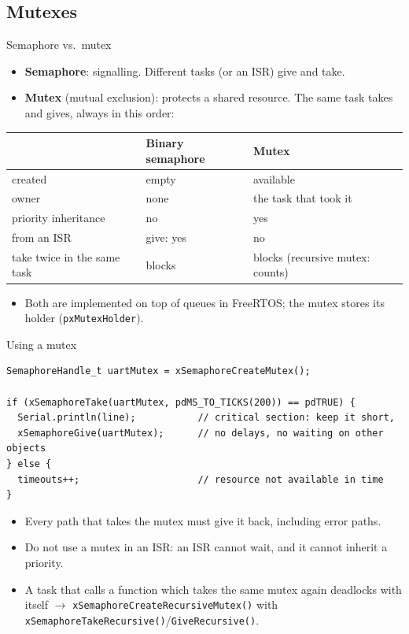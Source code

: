 \subsection{Mutexes}
\begin{frame}{Semaphore vs.\ mutex}
  \begin{itemize}
    \item \textbf{Semaphore}: signalling. Different tasks (or an ISR) give and take.
    \item \textbf{Mutex} (mutual exclusion): protects a shared resource. The same task takes and gives, always in this order:
  \end{itemize}
  \begin{center}\small
  \begin{tabular}{@{}lll@{}}
    \toprule
    & Binary semaphore & Mutex \\
    \midrule
    created & empty & available \\
    owner & none & the task that took it \\
    priority inheritance & no & yes \\
    from an ISR & give: yes & no \\
    take twice in the same task & blocks & blocks (recursive mutex: counts) \\
    \bottomrule
  \end{tabular}
  \end{center}
  \begin{itemize}
    \item Both are implemented on top of queues in FreeRTOS; the mutex stores its holder (\texttt{pxMutexHolder}).
  \end{itemize}
\end{frame}

\begin{frame}[fragile]{Using a mutex}
\begin{lstlisting}
SemaphoreHandle_t uartMutex = xSemaphoreCreateMutex();

if (xSemaphoreTake(uartMutex, pdMS_TO_TICKS(200)) == pdTRUE) {
  Serial.println(line);           // critical section: keep it short,
  xSemaphoreGive(uartMutex);      // no delays, no waiting on other objects
} else {
  timeouts++;                     // resource not available in time
}
\end{lstlisting}
  \begin{itemize}
    \item Every path that takes the mutex must give it back, including error paths.
    \item Do not use a mutex in an ISR: an ISR cannot wait, and it cannot inherit a priority.
    \item A task that calls a function which takes the same mutex again deadlocks with itself $\rightarrow$ \texttt{xSemaphoreCreateRecursiveMutex()} with \texttt{xSemaphoreTakeRecursive()}/\texttt{GiveRecursive()}.
  \end{itemize}
\end{frame}


